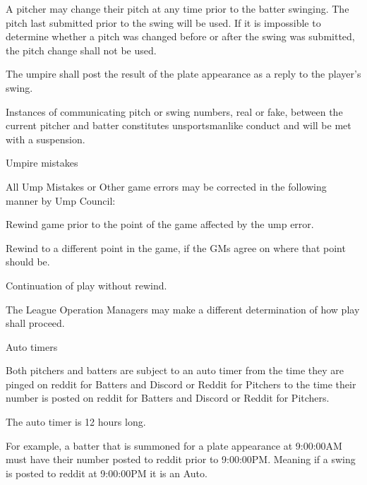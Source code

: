 \begin{deepEnumerate}
\begin{deepEnumerate}
\begin{deepEnumerate}
			\item A pitcher may change their pitch at any time prior to the batter swinging. The pitch last submitted prior to the swing will be used.
			If it is impossible to determine whether a pitch was changed before or after the swing was submitted, the pitch change shall not be used.
		\end{deepEnumerate}
		\item The umpire shall post the result of the plate appearance as a reply to the player's swing.
		\item Instances of communicating pitch or swing numbers, real or fake, 
		between the current pitcher and batter constitutes unsportsmanlike conduct and will be met with a suspension.
		\item Umpire mistakes
		\begin{deepEnumerate}
			\item All Ump Mistakes or Other game errors may be corrected in the following manner by Ump Council:
			\begin{deepEnumerate}
				\item Rewind game prior to the point of the game affected by the ump error.
				\item Rewind to a different point in the game, if the GMs agree on where that point should be.
				\item Continuation of play without rewind.
			\end{deepEnumerate}
			\item The League Operation Managers may make a different determination of how play shall proceed.
		\end{deepEnumerate}
	\end{deepEnumerate}
	\item Auto timers
	\begin{deepEnumerate}
		\item  Both pitchers and batters are subject to an auto timer from the time they are pinged on reddit for Batters and Discord or Reddit for Pitchers to the time their number is posted on reddit for Batters and Discord or Reddit for Pitchers. 
		\item The auto timer is 12 hours long.
		\begin{deepEnumerate}
			\item For example, a batter that is summoned for a plate appearance at 9:00:00AM must have their number posted to reddit prior to 9:00:00PM.  Meaning if a swing is posted to reddit at 9:00:00PM it is an Auto.
		\end{deepEnumerate}

\end{deepEnumerate}
\end{deepEnumerate}
